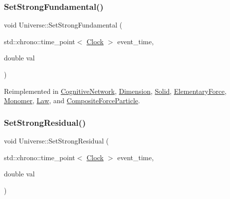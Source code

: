 \mbox{\label{classUniverse_aafec97a231126b71c73ac1258609a284}} 
\subsubsection{\texorpdfstring{Set\+Strong\+Fundamental()}{SetStrongFundamental()}}
{\footnotesize\ttfamily void Universe\+::\+Set\+Strong\+Fundamental (\begin{DoxyParamCaption}\item[{std\+::chrono\+::time\+\_\+point$<$ \mbox{\hyperlink{universe_8h_a0ef8d951d1ca5ab3cfaf7ab4c7a6fd80}{Clock}} $>$}]{event\+\_\+time,  }\item[{double}]{val }\end{DoxyParamCaption})\hspace{0.3cm}{\ttfamily [virtual]}}



Reimplemented in \mbox{\hyperlink{classCognitiveNetwork_ac54286eea279f5caa98b642b9084fd55}{Cognitive\+Network}}, \mbox{\hyperlink{classDimension_a2de864aaa4b1074684395dbe928468c1}{Dimension}}, \mbox{\hyperlink{classSolid_a4342786a7785b1a3816d20de02105bcf}{Solid}}, \mbox{\hyperlink{classElementaryForce_afb00e9a10ec33eeb1daefce39b0468b7}{Elementary\+Force}}, \mbox{\hyperlink{classMonomer_ad9df06c1a8264bfdb514ef3ba04ef4c7}{Monomer}}, \mbox{\hyperlink{classLaw_a4a7c8caa24acf453c1a8782a1ec4acf4}{Law}}, and \mbox{\hyperlink{classCompositeForceParticle_a28d835658edcbecf60162475a8cb1ab6}{Composite\+Force\+Particle}}.

\mbox{\label{classUniverse_a1b2d6197ddf3d613cc30bd04d22ed8b7}} 
\subsubsection{\texorpdfstring{Set\+Strong\+Residual()}{SetStrongResidual()}}
{\footnotesize\ttfamily void Universe\+::\+Set\+Strong\+Residual (\begin{DoxyParamCaption}\item[{std\+::chrono\+::time\+\_\+point$<$ \mbox{\hyperlink{universe_8h_a0ef8d951d1ca5ab3cfaf7ab4c7a6fd80}{Clock}} $>$}]{event\+\_\+time,  }\item[{double}]{val }\end{DoxyParamCaption})\hspace{0.3cm}{\ttfamily [virtual]}}



